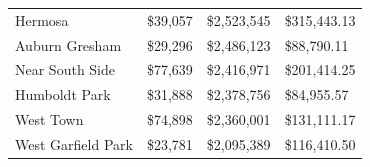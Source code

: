 \documentclass{article}
\begin{document}
\begin{table}[h!]
\begin{tabular}{|l|l|l|l|}
Hermosa                & \$39,057       & \$2,523,545       & \$315,443.13    \\
Auburn Gresham         & \$29,296       & \$2,486,123       & \$88,790.11     \\
Near South Side        & \$77,639       & \$2,416,971       & \$201,414.25    \\
Humboldt Park          & \$31,888       & \$2,378,756       & \$84,955.57     \\
West Town              & \$74,898       & \$2,360,001       & \$131,111.17    \\
West Garfield Park     & \$23,781       & \$2,095,389       & \$116,410.50    \\
\hline
\end{tabular}
\end{table}
\end{document}
